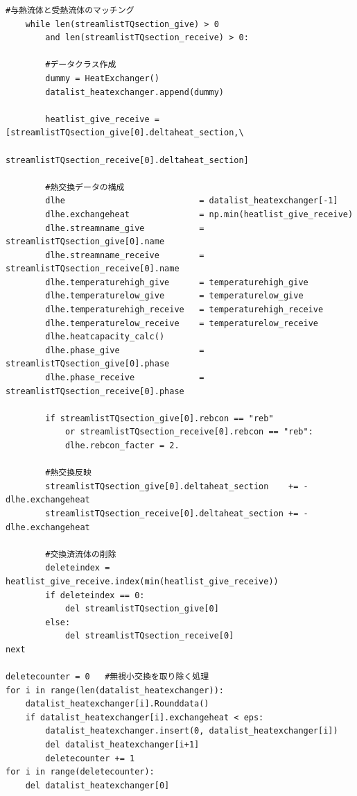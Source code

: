 \documentclass[a4j]{jsreport}
\begin{document}
\begin{lstlisting}[caption=グランドコンポジットカーブおよびTQ線図を書くコード]
    #与熱流体と受熱流体のマッチング
    while len(streamlistTQsection_give) > 0
        and len(streamlistTQsection_receive) > 0:

        #データクラス作成
        dummy = HeatExchanger()
        datalist_heatexchanger.append(dummy)

        heatlist_give_receive = [streamlistTQsection_give[0].deltaheat_section,\
                              streamlistTQsection_receive[0].deltaheat_section]

        #熱交換データの構成
        dlhe                           = datalist_heatexchanger[-1]
        dlhe.exchangeheat              = np.min(heatlist_give_receive)
        dlhe.streamname_give           = streamlistTQsection_give[0].name
        dlhe.streamname_receive        = streamlistTQsection_receive[0].name
        dlhe.temperaturehigh_give      = temperaturehigh_give
        dlhe.temperaturelow_give       = temperaturelow_give
        dlhe.temperaturehigh_receive   = temperaturehigh_receive
        dlhe.temperaturelow_receive    = temperaturelow_receive
        dlhe.heatcapacity_calc()
        dlhe.phase_give                = streamlistTQsection_give[0].phase
        dlhe.phase_receive             = streamlistTQsection_receive[0].phase

        if streamlistTQsection_give[0].rebcon == "reb"
            or streamlistTQsection_receive[0].rebcon == "reb":
            dlhe.rebcon_facter = 2.

        #熱交換反映
        streamlistTQsection_give[0].deltaheat_section    += - dlhe.exchangeheat
        streamlistTQsection_receive[0].deltaheat_section += - dlhe.exchangeheat

        #交換済流体の削除
        deleteindex = heatlist_give_receive.index(min(heatlist_give_receive))
        if deleteindex == 0:
            del streamlistTQsection_give[0]
        else:
            del streamlistTQsection_receive[0]
next

deletecounter = 0   #無視小交換を取り除く処理
for i in range(len(datalist_heatexchanger)):
    datalist_heatexchanger[i].Rounddata()
    if datalist_heatexchanger[i].exchangeheat < eps:
        datalist_heatexchanger.insert(0, datalist_heatexchanger[i])
        del datalist_heatexchanger[i+1]
        deletecounter += 1
for i in range(deletecounter):
    del datalist_heatexchanger[0]



\end{lstlisting}
\end{document}
